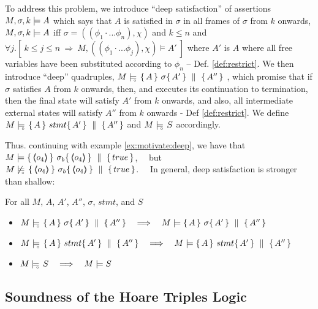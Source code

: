To address this problem, we introduce ``deep satisfaction'' of assertions $ M,\sigma ,{k} \models {A} $ which says that $A$ is satisfied in $\sigma$  in all frames of $\sigma$ from $k$ onwards, 
\ie  $ M,\sigma ,{k} \models {A} $ iff $\sigma = ((\phi_1\cdot ... \phi_n), \chi)$ and $k\leq n$ and $\forall j. [\  k\leq j \leq n \ \Rightarrow \ M, ((\phi_1\cdot ... \phi_j), \chi) \models A'\ ]$ where $A'$ is $A$ where all free variables have been substituted according to $\phi_n$ -- \cf Def. \ref{def:restrict}.
We then introduce ``deep'' quadruples,   $M \models\!\!\!\!_{_{\circ}}\   \{\, A \, \}\ \sigma \{\, A' \, \} \, \,\parallel\,\, \{\, A'' \, \} $ , which promise that if $\sigma$ satisfies $A$ from $k$ onwards, then, and executes its continuation to termination, then the final state will satisfy $A'$ from $k$ onwards, and also, all intermediate external states will satisfy $A''$ from $k$ onwards - \cf Def \ref{def:restrict}.
We define   $M \models\!\!\!\!_{_{\circ}}\   \{\, A \, \}\ stmt \{\, A' \, \} \, \,\parallel\,\, \{\, A'' \, \}  $ and  $M \models\!\!\!\!_{_{\circ}}\  S $ accordingly.


Thus. continuing with example \ref{ex:motivate:deep},  we have that\ \  $\satisfies {M} {\quadruple   {\inside {o_4}} }   {\sigma_b}   {\inside {o_4}}  {true} $, \ \ 
 but \\ $\notSatisfiesD {M}   {\quadruple   {\inside {o_4}} }  {\sigma_b}   {\inside {o_4}}  {true}  $.
\ \  In general, deep satisfaction is stronger than shallow:   
 
\begin{lemma}
For all $M$, $A$, $A'$, $A''$, $\sigma$, $stmt$, and $S$
\begin{itemize}
\item
 $M \models\!\!\!\!_{_{\circ}}\   \{\, A \, \}\ \sigma \{\, A' \, \} \, \,\parallel\,\, \{\, A'' \, \}    \ \ \ \Longrightarrow \ \ \   M \models  \{\, A \, \}\ \sigma \{\, A' \, \} \, \,\parallel\,\, \{\, A'' \, \} $

\item
 $M \models\!\!\!\!_{_{\circ}}\   \{\, A \, \}\ stmt \{\, A' \, \} \, \,\parallel\,\, \{\, A'' \, \}    \ \ \ \Longrightarrow \ \ \   M \models  \{\, A \, \}\ stmt \{\, A' \, \} \, \,\parallel\,\, \{\, A'' \, \} $
\item 
$\satisfiesD {M} {S}  \ \ \ \Longrightarrow \ \ \ \satisfies {M} {S}$
\end{itemize}
\end{lemma}



 

\subsection{Soundness of the Hoare Triples Logic}

